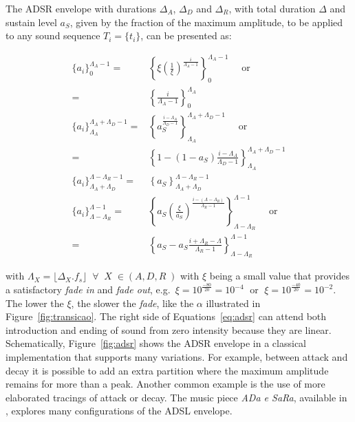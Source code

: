 The ADSR envelope with durations $\Delta_A$, $\Delta_D$ and $\Delta_R$, with total duration $\Delta$ and sustain level $a_S$, given by the fraction of the maximum amplitude, to be applied to any sound sequence $T_i=\{t_i\}$, can be presented as:

\begin{equation}\label{eq:adsr}
\begin{split}
\{a_i\}_0^{\Lambda_A-1}  = & \left\{\xi\left(\frac{1}{\xi}\right)^{\frac{i}{\Lambda_A-1}}\right\}_0^{\Lambda_A-1} \quad \text{ or }\\ = & \left\{\frac{i}{\Lambda_A-1}\right\}_0^{\Lambda_A}\\
\{a_i\}_{\Lambda_A}^{\Lambda_A+\Lambda_D-1} = & \left\{a_S^{\frac{i-\Lambda_A}{\Lambda_D-1}}  \right\}_{\Lambda_A}^{\Lambda_A+\Lambda_D-1} \quad \text{ or } \\ = &  \left\{1-(1-a_S)\frac{i-\Lambda_A}{\Lambda_D-1}\right\}_{\Lambda_A}^{\Lambda_A+\Lambda_D-1}\\
\{ a_i \}_{\Lambda_A+\Lambda_D}^{\Lambda-\Lambda_R-1} = & \left\{ a_S \right\}_{\Lambda_A+\Lambda_D}^{\Lambda-\Lambda_R-1} \\
\{ a_i \}_{\Lambda-\Lambda_R}^{\Lambda-1}  = & \left\{ a_S\left(\frac{\xi}{a_S} \right)^{\frac{i-(\Lambda-\Lambda_R)}{\Lambda_R-1}} \right\}_{\Lambda-\Lambda_R}^{\Lambda-1} \quad \text{ or } \\ = &  \left\{ a_S - a_S\frac{i+\Lambda_R-\Lambda}{\Lambda_R-1}\right\}_{\Lambda-\Lambda_R}^{\Lambda-1} 
\end{split}
\end{equation}


\noindent with $\Lambda_X=\lfloor \Delta_X . f_s \rfloor\;\;\forall\;\; X \; \in
(A,D,R\;)$ with $\xi$ being a small value that provides a satisfactory \emph{fade in} and \emph{fade out}, e.g.\ $\xi=10^{\frac{-80}{20}}=10^{-4}\;$ or $\;\xi=10^{\frac{-40}{20}}=10^{-2}$. The lower the $\xi$, the slower the \emph{fade}, like the $\alpha$ illustrated in Figure~\ref{fig:transicao}. The right side of Equations~\ref{eq:adsr} can attend both introduction and ending of sound from zero intensity because they are linear. Schematically, Figure~\ref{fig:adsr} shows the ADSR envelope in a classical implementation that supports many variations. For example, between attack and decay it is possible to add an extra partition where the maximum amplitude remains for more than a peak. Another common example is the use of more elaborated tracings of attack or decay. The music piece \emph{ADa e SaRa}, available 
in \massa, explores many configurations of the ADSL envelope.

